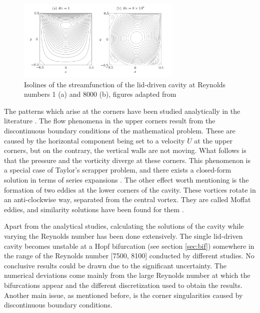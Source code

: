 \begin{figure}[ht!]
\begin{center}
  \includegraphics[width=0.7\textwidth]{figs/fig_kuhlmann2019}
\end{center}
\caption{Isolines of the streamfunction of the lid-driven cavity at Reynolds
  numbers 1 (a) and 8000 (b), figures adapted from \cite{kuhlmann2019}}
\label{fig:Re_cav_simple}
\end{figure}

The patterns which arise at the corners have been studied analytically in the
literature \citep{}. The flow phenomena in the upper corners result from the
discontinuous boundary conditions of the mathematical problem. These are caused
by the horizontal component being set to a velocity $U$ at the upper corners,
but on the contrary, the vertical walls are not moving. What follows is that
the pressure and the vorticity diverge at these corners. This phenomenon is a 
special case of Taylor's scrapper problem, and there exists a closed-form
solution in terms of series expansions \citep{kuhlmann2019}. The other effect
worth mentioning is the formation of two eddies at the lower corners of the cavity.
These vortices rotate in an anti-clockwise way, separated from the central
vortex. They are called Moffat eddies, and similarity solutions have
been found for them \citep{}.

Apart from the analytical studies, calculating the solutions of the cavity
while varying the Reynolds number has been done extensively. The single
lid-driven cavity becomes unstable at a Hopf bifurcation (see section \ref{sec:bif})
somewhere in the range of the Reynolds number [7500, 8100] \citep{kuhlmann2019}
conducted by different studies. No conclusive results could be drawn due to the
significant uncertainty. The numerical deviations come mainly from the large
Reynolds number at which the bifurcations appear and the different
discretization used to obtain the results. Another main issue, as mentioned
before, is the corner singularities caused by discontinuous boundary
conditions.

